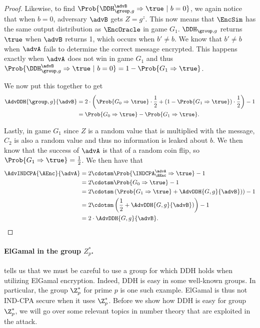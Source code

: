\begin{proof}
	Likewise, to find $\Prob{\DDH_{\group, g}^\advB\Rightarrow\true \ | \ b=0}$, we again notice that when $b=0$, adversary $\advB$ gets $Z = g^z$. This now means that $\EncSim$ has the same output distribution as $\EncOracle$ in game $G_1$. $\DDH_{\group, g}$ returns $\true$ when $\advB$ returns 1, which occurs when $b'\neq b$. We know that $b' \neq b$ when $\advA$ fails to determine the correct message encrypted. This happens exactly when $\advA$ does not win in game $G_1$ and thus $\Prob{\DDH_{\group, g}^\advB\Rightarrow\true \ | \ b=0} = 1 - \Prob{G_1 \Rightarrow\true}$. 
	
	We now put this together to get
	\begin{align*}
		\AdvDDH{\group,g}{\advB} &= 2 \cdot \left(\Prob{G_0 \Rightarrow\true} \cdot \frac{1}{2} + (1 - \Prob{G_1 \Rightarrow\true})\cdot\frac{1}{2}\right) - 1 \\
		&= \Prob{G_0 \Rightarrow\true} - \Prob{G_1 \Rightarrow\true}.
	\end{align*}
	
	Lastly, in game $G_1$ since $Z$ is a random value that is multiplied with the message, $C_2$ is also a random value and thus no information is leaked about $b$. We then know that the success of $\advA$ is that of a random coin flip, so $\Prob{G_1 \Rightarrow\true} = \frac{1}{2}$. We then have that
	\begin{align*}
		\AdvINDCPA{\AEnc}{\advA} 
		&= 2\cdotsm\Prob{\INDCPA_{\AEnc}^\advA\Rightarrow\true} - 1\\
		&= 2\cdotsm\Prob{G_0\Rightarrow\true} - 1\\
		&= 2\cdotsm\left(\Prob{G_1\Rightarrow\true} + \AdvDDH{G,g}{\advB})\right) - 1\\
		&= 2\cdotsm\left(\frac{1}{2}+ \AdvDDH{G,g}{\advB})\right) - 1 \\
		&= 2 \cdot \AdvDDH{G,g}{\advB}.
	\end{align*}
\end{proof}

\paragraph{ElGamal in the group $Z_p^*$.}  tells us that we must be careful to use a group for which DDH holds when utilizing ElGamal encryption. Indeed, DDH is easy in some well-known groups. In particular, the group $\Z_p^*$ for prime $p$ is one such example. ElGamal is thus not IND-CPA secure when it uses $\Z_p^*$. Before we show how DDH is easy for group $\Z_p^*$, we will go over some relevant topics in number theory that are exploited in the attack. 


